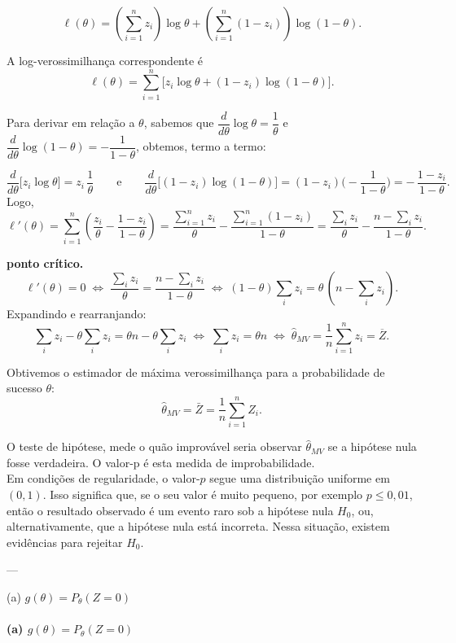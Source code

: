 
\[
\ell(\theta)
= \left(\sum_{i=1}^{n} z_i\right)\log \theta
+ \left(\sum_{i=1}^{n}(1-z_i)\right)\log(1-\theta).
\]

A log-verossimilhança correspondente é
\[
\boxed{\ell(\theta) 
= \sum_{i=1}^n \big[z_i \log\theta + (1-z_i)\log(1-\theta)\big].}
\]

Para derivar em relação a \(\theta\), sabemos que 
\(\dfrac{d}{d\theta}\log\theta=\dfrac1\theta\) e 
\(\dfrac{d}{d\theta}\log(1-\theta)= -\dfrac1{1-\theta}\), obtemos,
termo a termo:

\[
\frac{d}{d\theta}\Big[z_i\log\theta\Big]
= z_i\,\frac1\theta
\qquad\text{e}\qquad
\frac{d}{d\theta}\Big[(1-z_i)\log(1-\theta)\Big]
= (1-z_i)\Big(-\frac1{1-\theta}\Big)
= -\,\frac{1-z_i}{1-\theta}.
\]
Logo,
\[
\ell'(\theta)
=\sum_{i=1}^n\left(\frac{z_i}{\theta}-\frac{1-z_i}{1-\theta}\right)
= \frac{\sum_{i=1}^n z_i}{\theta} - \frac{\sum_{i=1}^n(1-z_i)}{1-\theta}
= \frac{\sum_i z_i}{\theta} - \frac{n-\sum_i z_i}{1-\theta}.
\]

 \textbf{ponto crítico.}
\[
\ell'(\theta)=0
\;\Longleftrightarrow\;
\frac{\sum_i z_i}{\theta}
= \frac{n-\sum_i z_i}{1-\theta}
\;\Longleftrightarrow\;
(1-\theta)\sum_i z_i=\theta\,(n-\sum_i z_i).
\]
Expandindo e rearranjando:
\[
\sum_i z_i - \theta\sum_i z_i = \theta n - \theta\sum_i z_i
\;\Longleftrightarrow\;
\sum_i z_i = \theta n
\;\Longleftrightarrow\;
\widehat\theta_{MV}=\frac1n\sum_{i=1}^n z_i=\overline Z.
\]


Obtivemos o estimador de máxima verossimilhança para a probabilidade de sucesso \(\theta\):
\[
\boxed{\hat{\theta}_{MV} = \bar{Z} = \frac{1}{n}\sum_{i=1}^n Z_i.}
\]

O teste de hipótese, mede o quão improvável seria observar $\hat{\theta}_{MV}$ se a hipótese nula fosse verdadeira. O valor-p é esta medida de improbabilidade.
\\[1em]
Em condições de regularidade, o valor-$p$ segue uma distribuição uniforme em $(0,1)$.
Isso significa que, se o seu valor é muito pequeno, por exemplo $p \leq 0{,}01$,
então o resultado observado é um evento raro sob a hipótese nula $H_0$,
ou, alternativamente, que a hipótese nula está incorreta.
Nessa situação, existem evidências para rejeitar $H_0$.


---

(a) \( g(\theta) = P_\theta(Z=0) \)

\paragraph{(a) \(g(\theta)=P_\theta(Z=0)\)}

